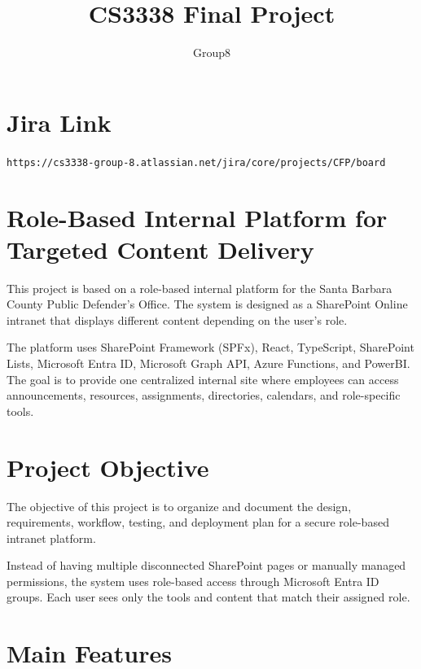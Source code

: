 \documentclass{article}
\begin{document}
\title{CS3338 Final Project}
\author{Group8}
\date{}
\maketitle

\section*{Jira Link}

\texttt{https://cs3338-group-8.atlassian.net/jira/core/projects/CFP/board}

\section*{Role-Based Internal Platform for Targeted Content Delivery}

This project is based on a role-based internal platform for the Santa Barbara County Public Defender’s Office. The system is designed as a SharePoint Online intranet that displays different content depending on the user’s role.

The platform uses SharePoint Framework (SPFx), React, TypeScript, SharePoint Lists, Microsoft Entra ID, Microsoft Graph API, Azure Functions, and PowerBI. The goal is to provide one centralized internal site where employees can access announcements, resources, assignments, directories, calendars, and role-specific tools.

\section*{Project Objective}

The objective of this project is to organize and document the design, requirements, workflow, testing, and deployment plan for a secure role-based intranet platform.

Instead of having multiple disconnected SharePoint pages or manually managed permissions, the system uses role-based access through Microsoft Entra ID groups. Each user sees only the tools and content that match their assigned role.

\section*{Main Features}
\end{document}
